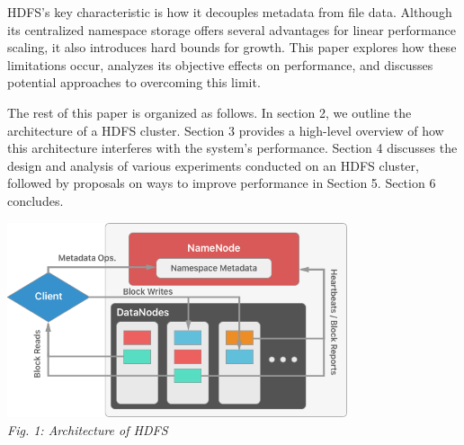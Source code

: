 \documentclass[11pt, a4paper]{article}
\begin{document}
\begin{multicols*}{2}
HDFS's key characteristic is how it decouples metadata from file data. Although its centralized namespace storage offers several advantages for linear performance scaling, it also introduces hard bounds for growth. This paper explores how these limitations occur, analyzes its objective effects on performance, and discusses potential approaches to overcoming this limit.

The rest of this paper is organized as follows. In section 2, we outline the architecture of a HDFS cluster. Section 3 provides a high-level overview of how this architecture interferes with the system's performance. Section 4 discusses the design and analysis of various experiments conducted on an HDFS cluster, followed by proposals on ways to improve performance in Section 5. Section 6 concludes.

\end{multicols*}

\begin{center}
	\includegraphics[keepaspectratio=true, width=0.75\textwidth]{Architecture}\\
	\textit{Fig. 1: Architecture of HDFS}
\end{center}
\end{document}
